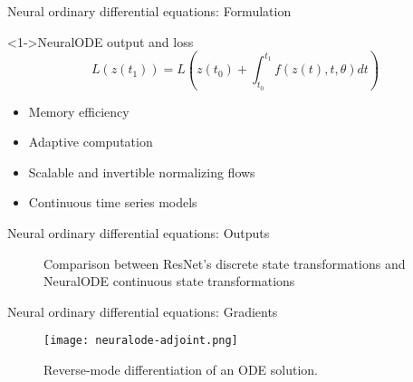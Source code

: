 \begin{frame}{Neural ordinary differential equations: Formulation}

    \begin{block}<1->{NeuralODE output and loss}
        \begin{equation*}
            L(z(t_1)) = L\left(z(t_0) + \int_{t_0}^{t_1}{f(z(t), t, \theta)dt}\right)
        \end{equation*}
    \end{block}

    \begin{itemize}
        \item<2-> Memory efficiency
        \item<2-> Adaptive computation
        \item<2-> Scalable and invertible normalizing flows
        \item<2-> Continuous time series models
    \end{itemize}
\end{frame}

\begin{frame}{Neural ordinary differential equations: Outputs}
    \begin{figure}[h]
        \centering
        \caption{Comparison between ResNet's discrete state transformations and NeuralODE continuous state transformations}
        \label{fig:resnet-vs-odenet}
    \end{figure}
\end{frame}

\begin{frame}{Neural ordinary differential equations: Gradients}
    \begin{figure}[h]
        \centering
        \texttt{[image: neuralode-adjoint.png]}
        \caption{Reverse-mode differentiation of an ODE solution. \cite{chenNeuralOrdinaryDifferential2019}}
        \label{fig:neuralode-adjoint}
    \end{figure}
\end{frame}
